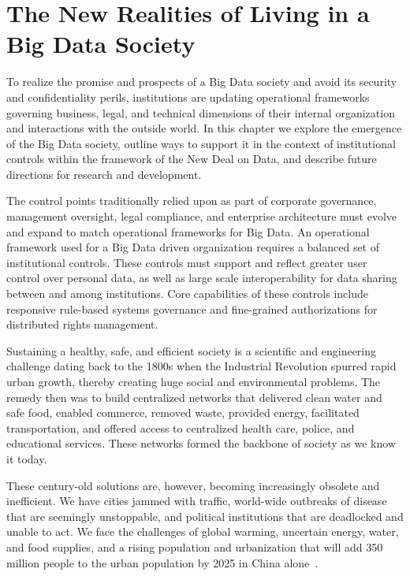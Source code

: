 \section{The New Realities of Living in a Big Data Society}

To realize the promise and prospects of a Big Data society and avoid its security and confidentiality perils, institutions are updating operational frameworks governing business, legal, and technical dimensions of their internal organization and interactions with the outside world.
In this chapter we explore the emergence of the Big Data society, outline ways to support it in the context of institutional controls within the framework of the New Deal on Data, and describe future directions for research and development.

The control points traditionally relied upon as part of corporate governance, management oversight, legal compliance, and enterprise architecture must evolve and expand to match operational frameworks for Big Data.
An operational framework used for a Big Data driven organization requires a balanced set of institutional controls.
These controls must support and reflect greater user control over personal data, as well as large scale interoperability for data sharing between and among institutions.
Core capabilities of these controls include responsive rule-based systems governance and fine-grained authorizations for distributed rights management.

Sustaining a healthy, safe, and efficient society is a scientific and engineering challenge dating back to the 1800s when the Industrial Revolution spurred rapid urban growth, thereby creating huge social and environmental problems.
The remedy then was to build centralized networks that delivered clean water and safe food, enabled commerce, removed waste, provided energy, facilitated transportation, and offered access to centralized health care, police, and educational services.
These networks formed the backbone of society as we know it today.

These century-old solutions are, however, becoming increasingly obsolete and inefficient.
We have cities jammed with traffic, world-wide outbreaks of disease that are seemingly unstoppable, and political institutions that are deadlocked and unable to act.
We face the challenges of global warming, uncertain energy, water, and food supplies, and a rising population and urbanization that will add 350 million people to the urban population by 2025 in China alone~\cite{cities2009}.

